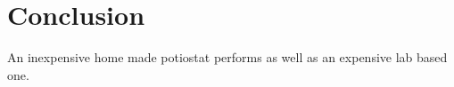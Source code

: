 \section{Conclusion}

An inexpensive home made potiostat performs as well as an expensive lab based one.